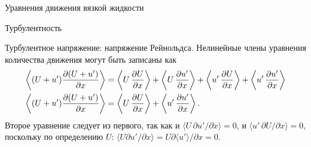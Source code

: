 \begin{chapter}{Уравнения движения вязкой жидкости}
\begin{section}{Турбулентность}
\begin{paragraph}{Турбулентное напряжение: напряжение Рейнольдса.}
Нелинейные члены уравнения количества движения могут быть записаны как
\begin{align}\label{eq:8.7}
\left< (U+u')\frac{\partial{(U+u')}}{\partial{x}} \right> 
  &= \left< U\,\frac{\partial{U}}{\partial{x}}\right> 
     + \left< U\,\frac {\partial{u'}}{\partial{x}}\right> 
     + \left< u' \,\frac {\partial{U}}{\partial{x}}\right> 
     + \left< u' \,\frac {\partial{u'}}{\partial{x}}\right> \notag \\
\left< (U+u')\frac{\partial{(U+u')}}{\partial{x}} \right> 
  &= \left< U\,\frac{\partial{U}}{\partial{x}}\right> 
    + \left<u' \,\frac{\partial{u'}}{\partial{x}}\right>.
\end{align}
Второе уравнение следует из первого, так как 
и $\langle U\,\partial{u'}/\partial{x}\rangle = 0$, 
и $\langle u'\,\partial{U}/\partial{x}\rangle = 0$, 
поскольку по определению $U$:
$\langle U \partial{u'}/\partial{x}\rangle 
 = U \partial{\langle u' \rangle }/\partial{x} = 0$.
%


\end{paragraph}
\end{section}
\end{chapter}
